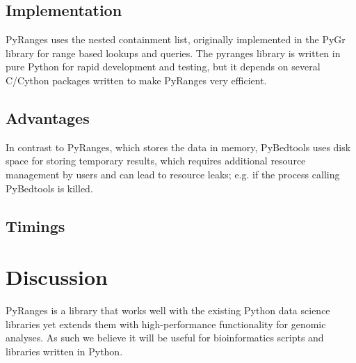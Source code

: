 \documentclass[10pt,letterpaper]{article}
\begin{document}

\subsection*{Implementation}

PyRanges uses the nested containment list, originally implemented in the PyGr
library \cite{doi:10.1093/bioinformatics/btl647} for range based lookups and
queries. The pyranges library is written in pure Python for rapid development
and testing, but it depends on several C/Cython packages written to make
PyRanges very efficient.

\subsection*{Advantages}

In contrast to PyRanges, which stores the data in memory, PyBedtools uses disk
space for storing temporary results, which requires additional resource
management by users and can lead to resource leaks; e.g. if the process calling
PyBedtools is killed.

\subsection*{Timings}



\section*{Discussion}

PyRanges is a library that works well with the existing Python data science
libraries yet extends them with high-performance functionality for genomic
analyses. As such we believe it will be useful for bioinformatics scripts and
libraries written in Python.




\end{document}
